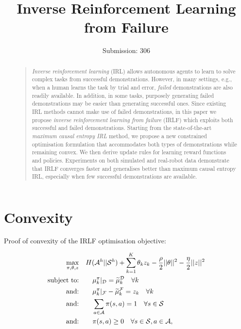 \documentclass{aamas2016}
\begin{document}
%
\title{Inverse Reinforcement Learning from Failure}
\author{Submission: 306}
\maketitle
\begin{abstract}
\begin{quote}

\emph{Inverse reinforcement learning} (IRL) allows autonomous agents to learn to solve complex tasks from successful demonstrations.  However, in many settings, e.g., when a human learns the task by trial and error, \emph{failed} demonstrations are also readily available.  In addition, in some tasks, purposely generating failed demonstrations may be easier than generating successful ones.  Since existing IRL methods cannot make use of failed demonstrations, in this paper we propose \emph{inverse reinforcement learning from failure} (IRLF) which exploits both successful and failed demonstrations.  Starting from the state-of-the-art \emph{maximum causal entropy IRL} method, we propose a new constrained optimisation formulation that accommodates both types of demonstrations while remaining convex.  We then derive update rules for learning reward functions and policies. Experiments on both simulated and real-robot data demonstrate that IRLF converges faster and generalises better than maximum causal entropy IRL, especially when few successful demonstrations are available.

\end{quote}
\end{abstract}

\section{Convexity}

Proof of convexity of the IRLF optimisation objective:

\begin{align}
 \quad\max\limits_{\pi,\theta,z}&\quad H(\mathcal{A}^h||\mathcal{S}^h) + \sum_{k=1}^K \theta_k z_k - \frac{\rho}{2}||\mathbf{\theta}||^2 - \frac{\eta}{2}||z||^2 \label{eq:primal_obj_failure}\\
\hbox{subject to:}&\quad \quad\mu^{\pi}_k|_{\mathcal{D}}=\widetilde{\mu}^{\mathcal{D}}_k\quad\forall k \label{eq:features_equality_constraint_failure}\\
\hbox{and:}&\quad \quad  \mu_k^{\pi}|_{\mathcal{F}} -\widetilde{\mu}_k^{\mathcal{F}}=z_k \quad \forall k\\
\hbox{and:}&\quad \quad\sum_{a\in\mathcal{A}}\pi(s,a)  = 1\quad\forall s\in\mathcal{S}\\
\hbox{and:}&\quad \quad\pi(s,a) \geq 0\quad\forall s\in\mathcal{S},a\in\mathcal{A},  
\end{align}
\end{document}
